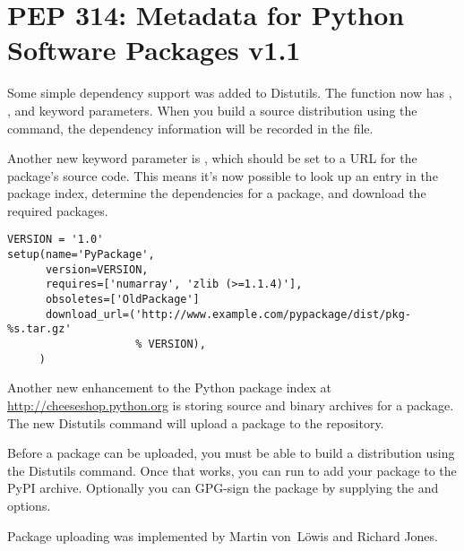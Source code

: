 \documentclass{howto}
\begin{document}
\begin{seealso}


\end{seealso}


\section{PEP 314: Metadata for Python Software Packages v1.1\label{pep-314}}

Some simple dependency support was added to Distutils.  The
 function now has , ,
and  keyword parameters.  When you build a source
distribution using the  command, the dependency
information will be recorded in the  file.

Another new keyword parameter is , which should be
set to a URL for the package's source code.  This means it's now
possible to look up an entry in the package index, determine the
dependencies for a package, and download the required packages.

\begin{verbatim}
VERSION = '1.0'
setup(name='PyPackage', 
      version=VERSION,
      requires=['numarray', 'zlib (>=1.1.4)'],
      obsoletes=['OldPackage']
      download_url=('http://www.example.com/pypackage/dist/pkg-%s.tar.gz'
                    % VERSION),
     )
\end{verbatim}

Another new enhancement to the Python package index at
\url{http://cheeseshop.python.org} is storing source and binary
archives for a package.  The new  Distutils command
will upload a package to the repository.

Before a package can be uploaded, you must be able to build a
distribution using the  Distutils command.  Once that
works, you can run  to add your package
to the PyPI archive.  Optionally you can GPG-sign the package by
supplying the  and
 options.

Package uploading was implemented by Martin von~L\"owis and Richard Jones. 
 
\begin{seealso}


\end{seealso}
\end{document}
